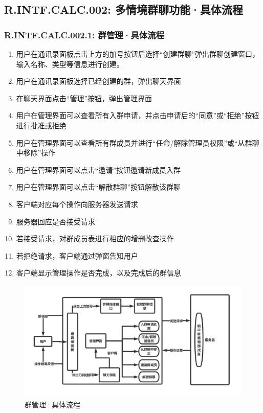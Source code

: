     \subsection{\color{red}R.INTF.CALC.002: 多情境群聊功能·具体流程}
        \subsubsection{R.INTF.CALC.002.1: 群管理·具体流程}
        \begin{enumerate}
            \item 用户在通讯录面板点击上方的加号按钮后选择“创建群聊”弹出群聊创建窗口，输入名称、类型等信息进行创建。
            \item 用户在通讯录面板选择已经创建的群，弹出聊天界面
            \item 在聊天界面点击“管理”按钮，弹出管理界面
            \item 用户在管理界面可以查看所有入群申请，并点击申请后的“同意”或“拒绝”按钮进行批准或拒绝
            \item 用户在管理界面可以查看所有群成员并进行“任命/解除管理员权限”或“从群聊中移除”操作
            \item 用户在管理界面可以点击“邀请”按钮邀请新成员入群
            \item 用户在管理界面可以点击“解散群聊”按钮解散该群聊
            \item 客户端对应每个操作向服务器发送请求
            \item 服务器回应是否接受请求
            \item 若接受请求，对群成员表进行相应的增删改查操作
            \item 若拒绝请求，客户端通过弹窗告知用户
            \item 客户端显示管理操作是否完成，以及完成后的群信息
        \end{enumerate}
        \begin{figure}[h]
            \centering
            \includegraphics[scale=0.4]{OutlineDesign/figures/群管理具体流程.png}
            \caption{群管理·具体流程}
            \label{fig:server_flow}
        \end{figure}
